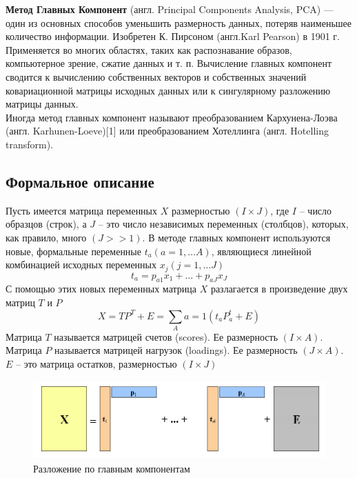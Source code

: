 \documentclass[../body.tex]{subfiles}
\begin{document}
	 \textbf{Метод Главных Компонент} (англ. Principal Components Analysis, PCA) — один из основных способов уменьшить размерность данных, потеряв наименьшее количество информации. Изобретен К. Пирсоном (англ.Karl Pearson) в 1901 г.
	 \newline \\
	  Применяется во многих областях, таких как распознавание образов, компьютерное зрение, сжатие данных и т. п. Вычисление главных компонент сводится к вычислению собственных векторов и собственных значений ковариационной матрицы исходных данных или к сингулярному разложению матрицы данных.
	  \newline \\
	   Иногда метод главных компонент называют преобразованием Кархунена-Лоэва (англ. Karhunen-Loeve)[1] или преобразованием Хотеллинга (англ. Hotelling transform). 
	 \subsection{Формальное описание}
	 Пусть имеется матрица переменных $X$ размерностью $(I×J)$, где $I$ – число образцов (строк), а $J$ – это число независимых переменных (столбцов), которых, как правило, много $(J>>1)$. В методе главных компонент используются новые, формальные переменные $t_a(a=1,…A)$, являющиеся линейной комбинацией исходных переменных $x_j(j=1,…J)$ 
	 \begin{equation}
	 	 t_a=p_{a1}x_1+ \dots + p_{aJ}x_J
	 \end{equation}
	 С помощью этих новых переменных матрица $X$ разлагается в произведение двух матриц $T$ и $P$
	 \begin{equation}
	 	X=TP^T + E = \sum\limits_{A}{a=1}(t_aP_a^t+E)
	 \end{equation}
	 Матрица $T$ называется матрицей счетов (scores). Ее размерность $(I×A)$.	 
	 Матрица $P$ называется матрицей нагрузок (loadings). Ее размерность $(J×A)$. 	 
	 $E$ – это матрица остатков, размерностью $(I×J)$
	 
	 \begin{figure}[H]
	 	\centering
	 	\includegraphics[width = 12cm, height = 3cm]{img/PCA.PNG}
	 	\caption{Разложение по главным компонентам}
	 	\label{fig:pca}
	 \end{figure}
	 
\end{document}
